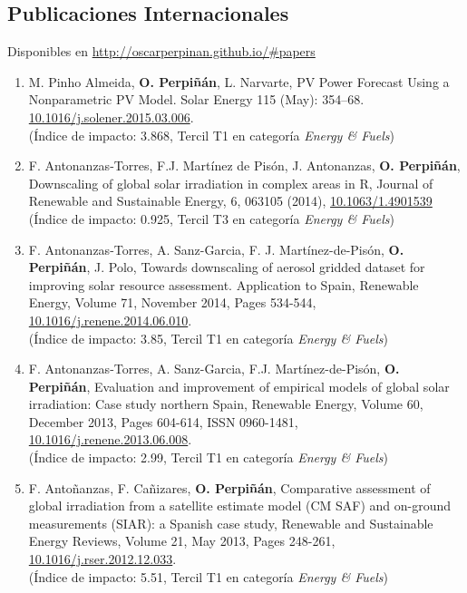 \documentclass[article, a4paper]{memoir}
\begin{document}
\subsection{Publicaciones Internacionales}
\label{sec-7-1}
Disponibles en \url{http://oscarperpinan.github.io/#papers}

\begin{enumerate}
\item M. Pinho Almeida, \textbf{O. Perpiñán}, L. Narvarte, PV Power Forecast Using a Nonparametric PV Model. Solar Energy 115 (May): 354–68. \url{10.1016/j.solener.2015.03.006}.\\ (Índice de impacto: 3.868, Tercil T1 en categoría \emph{Energy \& Fuels})

\item F. Antonanzas-Torres, F.J. Martínez de Pisón, J. Antonanzas, \textbf{O. Perpiñán}, Downscaling of global solar irradiation in complex areas in R, Journal of Renewable and Sustainable Energy, 6, 063105 (2014), \href{http://dx.doi.org/10.1063/1.4901539}{10.1063/1.4901539} \\ (Índice de impacto: 0.925, Tercil T3 en categoría \emph{Energy \& Fuels})

\item F. Antonanzas-Torres, A. Sanz-Garcia, F. J. Martínez-de-Pisón, \textbf{O. Perpiñán}, J. Polo, Towards downscaling of aerosol gridded dataset for improving solar resource assessment. Application to Spain, Renewable Energy, Volume 71, November 2014, Pages 534-544, \href{http://dx.doi.org/10.1016/j.renene.2014.06.010}{10.1016/j.renene.2014.06.010}. \\ (Índice de impacto: 3.85, Tercil T1 en categoría \emph{Energy \& Fuels})

\item F. Antonanzas-Torres, A. Sanz-Garcia, F.J. Martínez-de-Pisón, \textbf{O. Perpiñán}, Evaluation and improvement of empirical models of global solar irradiation: Case study northern Spain, Renewable Energy, Volume 60, December 2013, Pages 604-614, ISSN 0960-1481, \href{http://dx.doi.org/10.1016/j.renene.2013.06.008}{10.1016/j.renene.2013.06.008}. \\ (Índice de impacto: 2.99, Tercil T1 en categoría \emph{Energy \& Fuels})

\item F. Antoñanzas, F. Cañizares, \textbf{O. Perpiñán}, Comparative assessment of global irradiation from a satellite estimate model (CM SAF) and on-ground measurements (SIAR): a Spanish case study, Renewable and Sustainable Energy Reviews, Volume 21, May 2013, Pages 248-261, \href{http://dx.doi.org/10.1016/j.rser.2012.12.033}{10.1016/j.rser.2012.12.033}. \\ (Índice de impacto: 5.51, Tercil T1 en categoría \emph{Energy \& Fuels})


\end{enumerate}
\end{document}
